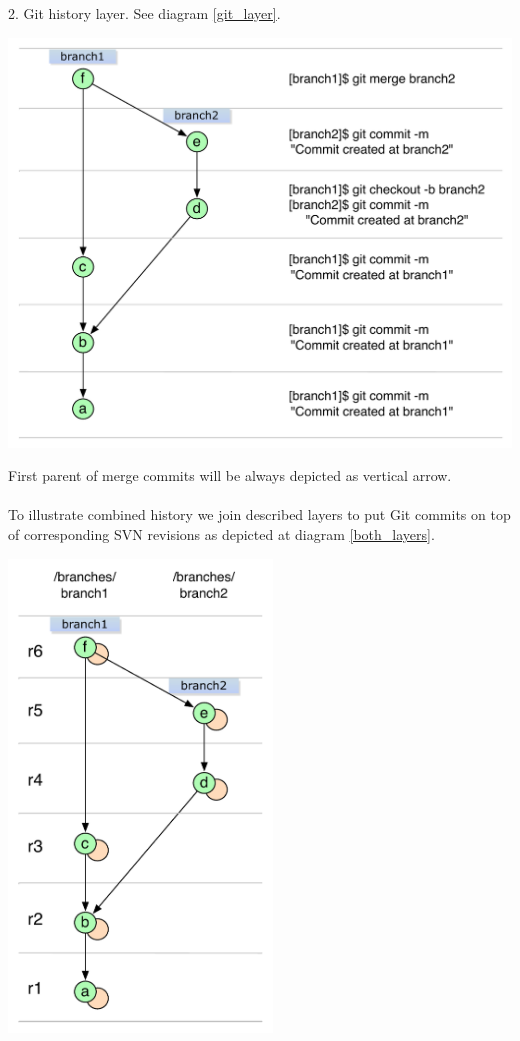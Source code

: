 2. Git history layer. See diagram \ref{git_layer}.
\begin{center}
\includegraphics[width=\textwidth]{img/legend/git_layer.pdf}%
\label{git_layer}%
\end{center}

First parent of merge commits will be always depicted as vertical arrow.
\\\\
To illustrate combined history we join described layers to put Git commits on top of corresponding SVN revisions as depicted at diagram \ref{both_layers}.
\begin{center}
\includegraphics[width=7.0cm]{img/legend/generalized_history.pdf}%
\label{both_layers}%
\end{center}